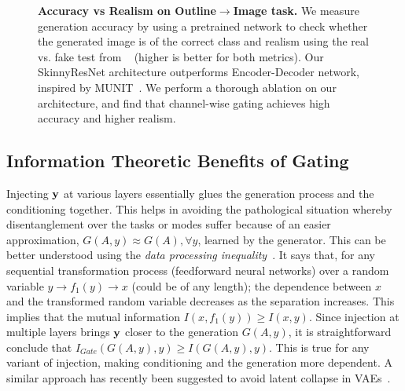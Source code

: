 \begin{figure}[t]
\begin{minipage}[b]{0.48\linewidth}
  \end{minipage}
  \caption{\small {\bf Accuracy vs Realism on Outline$\rightarrow$Image task.} We measure generation accuracy by using a pretrained network to check whether the generated image is of the correct class and realism using the real vs. fake test from ~\cite{zhang2016colorful,isola2016image2image} (higher is better for both metrics). Our SkinnyResNet architecture outperforms Encoder-Decoder network, inspired by MUNIT~\cite{huang2018multimodal}. We perform a thorough ablation on our architecture, and find that channel-wise gating achieves high accuracy and higher realism.
  }
  \label{fig:acc_vs_real}
\end{figure}





\subsection{Information Theoretic Benefits of Gating}
\label{sec:infoGAN} 
Injecting ${\bf y}$ at various layers essentially glues the generation process and the conditioning together.
This helps in avoiding the pathological situation whereby disentanglement over the tasks or modes suffer because of an easier approximation, $G(A,y) \approx G(A), \forall y$, learned by the generator. This can be better understood using the {\em data processing inequality}~\cite{cover2012informationTheory}. It says that, for any sequential transformation process (\eg feedforward neural networks) over a random variable $y \to f_1(y) \to  x$ (could be of any length); the dependence between $x$ and the transformed random variable decreases as the separation increases. 
This implies that the mutual information $I(x, f_1(y)) \geq I (x, y)$. Since injection at multiple layers brings ${\bf y}$ closer to the generation $G(A,y)$, it is straightforward conclude that $I_{Gate}(G(A,y), y) \geq I(G(A,y), y)$. This is true for any variant of injection, making conditioning and the generation more dependent. A similar approach has recently been suggested to avoid latent collapse in VAEs~\cite{Dieng18skipVAE}.


